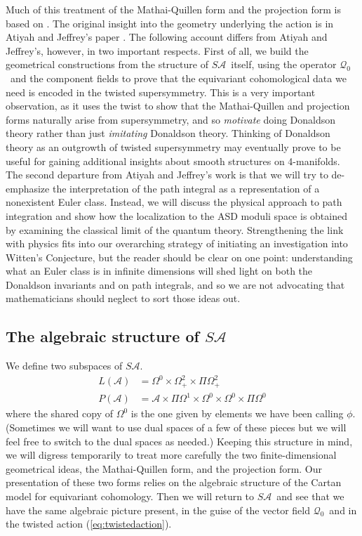 \documentclass[twoside]{amsart}
\newcommand{\mytexorpdfstring}[2]{\texorpdfstring{#1}{#2}}
\renewcommand{\eqref}[1]{(\ref{eq:#1})}
\newcommand{\enm}[1]{\ensuremath{#1}}
\renewcommand{\aa}{\enm{\mathcal{A}}}
\newcommand{\sa}{\enm{S\aa}}
\newcommand{\qzc}{\enm{\mathcal{Q}_{0}}}
\begin{document}
Much of this treatment of the Mathai-Quillen form and the projection
form is based on \cite{cordes}.  The original insight into the
geometry underlying the action is in Atiyah and Jeffrey's paper
\cite{atiyahjeffrey}.  The following account differs from Atiyah and
Jeffrey's, however, in two important respects.  First of all, we build
the geometrical constructions from the structure of \sa\ itself, using
the operator \qzc\ and the component fields to prove that the
equivariant cohomological data we need is encoded in the twisted
supersymmetry.  This is a very important observation, as it uses the
twist to show that the Mathai-Quillen and projection forms naturally
arise from supersymmetry, and so \emph{motivate} doing Donaldson
theory rather than just \emph{imitating} Donaldson theory.  Thinking
of Donaldson theory as an outgrowth of twisted supersymmetry may
eventually prove to be useful for gaining additional insights
about smooth structures on 4-manifolds.  The second departure from
Atiyah and Jeffrey's work is that we will try to de-emphasize the
interpretation of the path integral as a representation of a
nonexistent Euler class.  Instead, we will discuss the physical
approach to path integration and show how the localization to the ASD
moduli space is obtained by examining the classical limit of the
quantum theory.  Strengthening the link with physics fits into our
overarching strategy of initiating an investigation into Witten's
Conjecture, but the reader should be clear on one point: understanding
what an Euler class is in infinite dimensions will shed light on both
the Donaldson invariants and on path integrals, and so we are not
advocating that mathematicians should neglect to sort those ideas out.

\subsection{The algebraic structure of \mytexorpdfstring{$\sa$}{SA}}

We define two subspaces of \sa.
\begin{align}
    L(\aa) &= \Omega^{0} \times \Omega^{2}_{+} \times \Pi
    \Omega^{2}_{+} \\
    P(\aa) &= \aa \times\Pi \Omega^{1} \times \Omega^{0} \times \Omega^{0}
    \times \Pi \Omega^{0}
\end{align}
where the shared copy of \(\Omega^0\) is the one given by elements
we have been calling \(\phi\).
(Sometimes we will want to use dual spaces of a few of these pieces
but we will feel free to switch to the dual spaces as needed.)
Keeping this structure in mind, we will digress temporarily to treat
more carefully the two finite-dimensional geometrical ideas, the
Mathai-Quillen form, and the projection form.  Our presentation of these two
forms relies on the algebraic structure of the Cartan model for
equivariant cohomology.  Then we will return to
\sa\ and see that we have the same algebraic picture present, in the
guise of the vector
field \qzc\ and in the twisted action \eqref{twistedaction}.
\end{document}
